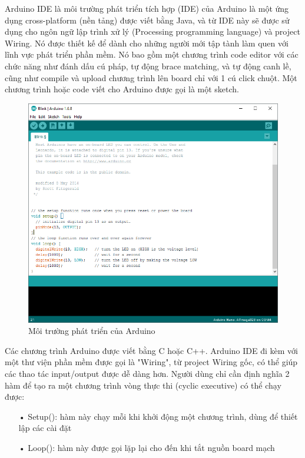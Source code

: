 Arduino IDE là môi trường phát triển tích hợp (IDE) của Arduino là một ứng dụng cross-platform (nền tảng) được viết bằng Java, và từ IDE này sẽ được sử dụng cho ngôn ngữ lập trình xử lý (Processing programming language) và project Wiring. Nó được thiết kế để dành cho những người mới tập tành làm quen với lĩnh vực phát triển phần mềm. Nó bao gồm một chương trình code editor với các chức năng như đánh dấu cú pháp, tự động brace matching, và tự động canh lề, cũng như compile và upload chương trình lên board chỉ với 1 cú click chuột. Một chương trình hoặc code viết cho Arduino được gọi là một sketch.

\newpage

\begin{center}
\begin{figure}[htp]
\centering    
\includegraphics[width=1\textwidth]{arduinonano_ide}
\caption[Môi trường phát triển của Arduino]{Môi trường phát triển của Arduino}
\label{fig:arduinonano_ide}
\end{figure}
\end{center}

Các chương trình Arduino được viết bằng C hoặc C++. Arduino IDE đi kèm với một thư viện phần mềm được gọi là "Wiring", từ project Wiring gốc, có thể giúp các thao tác input/output được dễ dàng hơn. Người dùng chỉ cần định nghĩa 2 hàm để tạo ra một chương trình vòng thực thi (cyclic executive) có thể chạy được:
\begin{itemize}
\item[•]Setup(): hàm này chạy mỗi khi khởi động một chương trình, dùng để thiết lập
các cài đặt
\item[•]Loop(): hàm này được gọi lặp lại cho đến khi tắt nguồn board mạch
\end{itemize}

